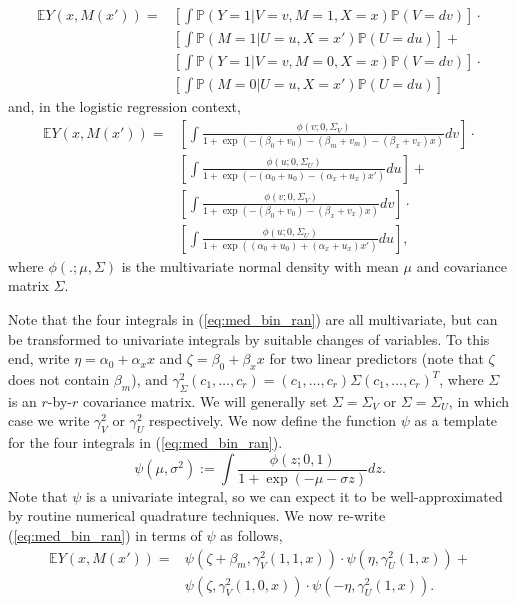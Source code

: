 \documentclass{article}
\newcommand{\bP}{\mathbb{P}}
\newcommand{\bE}{\mathbb{E}}
\begin{document}
%
\begin{align}
    \bE Y(x, M(x')) =& \left[\int \bP(Y=1 |V=v, M=1, X=x) \bP(V = dv)\right] \cdot \\
    & \left[\int \bP(M=1 |U=u, X=x') \bP(U=du)\right] +\\
     & \left[\int \bP(Y=1 |V=v, M=0, X=x) \bP(V = dv)\right] \cdot \\
     & \left[\int \bP(M=0 |U=u, X=x') \bP(U=du)\right]
\end{align}
%
and, in the logistic regression context,
%
\begin{align}
    \bE Y(x, M(x')) =& \left[ \int \frac{\phi(v; 0, \Sigma_V)}{1 + \exp(-(\beta_0 + v_0) - (\beta_m + v_m) - (\beta_x + v_x) x)}  dv \right] \cdot \label{eq:med_bin_ran}\\
    &\left[ \int \frac{\phi(u; 0, \Sigma_U)}{1 + \exp(-(\alpha_0 + u_0) - (\alpha_x + u_x) x')}  du \right] + \nonumber\\
    & \left[\int \frac{\phi(v; 0, \Sigma_V)}{1 + \exp(-(\beta_0 + v_0) - (\beta_x + v_x) x)} dv \right] \cdot \nonumber\\
    & \left[\int \frac{\phi(u; 0, \Sigma_U)}{1 + \exp((\alpha_0 + u_0) + (\alpha_x + u_x) x')} du \right], \nonumber
\end{align}
%
where $\phi(.; \mu, \Sigma)$ is the multivariate normal density with mean $\mu$ and covariance matrix $\Sigma$. 

Note that the four integrals in (\ref{eq:med_bin_ran}) are all multivariate, but can be transformed to univariate integrals by suitable changes of variables. To this end, write $\eta = \alpha_0 + \alpha_x x$ and $\zeta = \beta_0 + \beta_x x$ for two linear predictors (note that $\zeta$ does not contain $\beta_m$), and $\gamma^2_\Sigma(c_1, \ldots, c_r) = (c_1, \ldots, c_r) \Sigma (c_1, \ldots, c_r)^T$, where $\Sigma$ is an $r$-by-$r$ covariance matrix. We will generally set $\Sigma = \Sigma_V$ or $\Sigma = \Sigma_U$, in which case we write $\gamma^2_V$ or $\gamma^2_U$ respectively. We now define the function $\psi$ as a template for the four integrals in (\ref{eq:med_bin_ran}). 
%
$$
\psi(\mu, \sigma^2) := \int \frac{\phi(z; 0, 1)}{1 + \exp(-\mu - \sigma z)} dz.
$$
%
Note that $\psi$ is a univariate integral, so we can expect it to be well-approximated by routine numerical quadrature techniques. We now re-write (\ref{eq:med_bin_ran}) in terms of $\psi$ as follows,
%
\begin{align}
    \bE Y(x, M(x')) =& \psi(\zeta + \beta_m, \gamma^2_V(1, 1, x)) \cdot \psi(\eta, \gamma^2_U(1, x)) +\\
    & \psi(\zeta, \gamma^2_V(1, 0, x)) \cdot \psi(-\eta, \gamma^2_U(1, x)). \nonumber 
\end{align}
\end{document}
